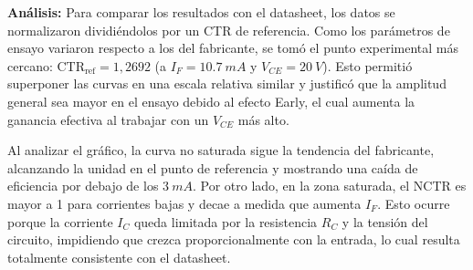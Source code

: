 \noindent\textbf{Análisis:}
Para comparar los resultados con el datasheet, los datos se normalizaron dividiéndolos por un CTR de referencia. 
Como los parámetros de ensayo variaron respecto a los del fabricante, se tomó el punto experimental más cercano: 
$\text{CTR}_{\text{ref}} = 1{,}2692$ (a $I_F = \SI{10.7}{mA}$ y $V_{CE} = \SI{20}{V}$). Esto permitió superponer las curvas en una escala 
relativa similar y justificó que la amplitud general sea mayor en el ensayo debido al efecto Early, el cual aumenta la ganancia 
efectiva al trabajar con un $V_{CE}$ más alto.

Al analizar el gráfico, la curva no saturada sigue la tendencia del fabricante, alcanzando la unidad en el punto de referencia y 
mostrando una caída de eficiencia por debajo de los $\SI{3}{mA}$. Por otro lado, en la zona saturada, el NCTR es mayor a 1 
para corrientes bajas y decae a medida que aumenta $I_F$. Esto ocurre porque la corriente $I_C$ queda limitada por la resistencia 
$R_C$ y la tensión del circuito, impidiendo que crezca proporcionalmente con la entrada, lo cual resulta totalmente consistente con 
el datasheet.